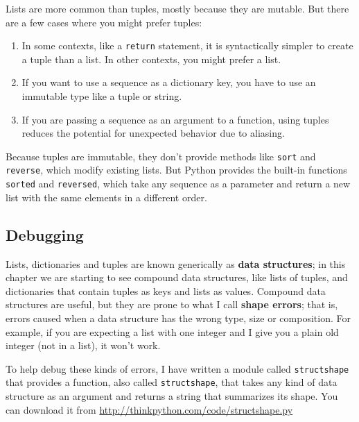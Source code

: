 \documentclass{article}
\begin{document}
Lists are more common than tuples, mostly because they are mutable.
But there are a few cases where you might prefer tuples:
\begin{enumerate}
    \item In some contexts, like a \verb|return| statement,
        it is syntactically simpler to create a tuple than a list.
        In other contexts, you might prefer a list.
    \item If you want to use a sequence as a dictionary key, you have
        to use an immutable type like a tuple or string.
    \item If you are passing a sequence as an argument to a function,
        using tuples reduces the potential for unexpected behavior due
        to aliasing.
\end{enumerate}
Because tuples are immutable, they don’t provide methods like \verb|sort|
and \verb|reverse|, which modify existing lists. But Python provides the
built-in functions \verb|sorted| and \verb|reversed|, which take any
sequence as a parameter and return a new list with the same elements in
a different order.

\subsection{Debugging}
Lists, dictionaries and tuples are known generically as
\textbf{data structures}; in this chapter we are starting to see
compound data structures, like lists of tuples, and dictionaries that
contain tuples as keys and lists as values. Compound data structures are useful, but
they are prone to what I call \textbf{shape errors}; that is, errors caused
when a data structure has the wrong type, size or composition. For
example, if you are expecting a list with one integer and I give you a
plain old integer (not in a list), it won’t work.

To help debug these kinds of errors, I have written a module called
\verb|structshape| that provides a function, also called \verb|structshape|,
that takes any kind of data structure as an argument and returns a string
that summarizes its shape. You can download it from
\url{http://thinkpython.com/code/structshape.py}
\end{document}
